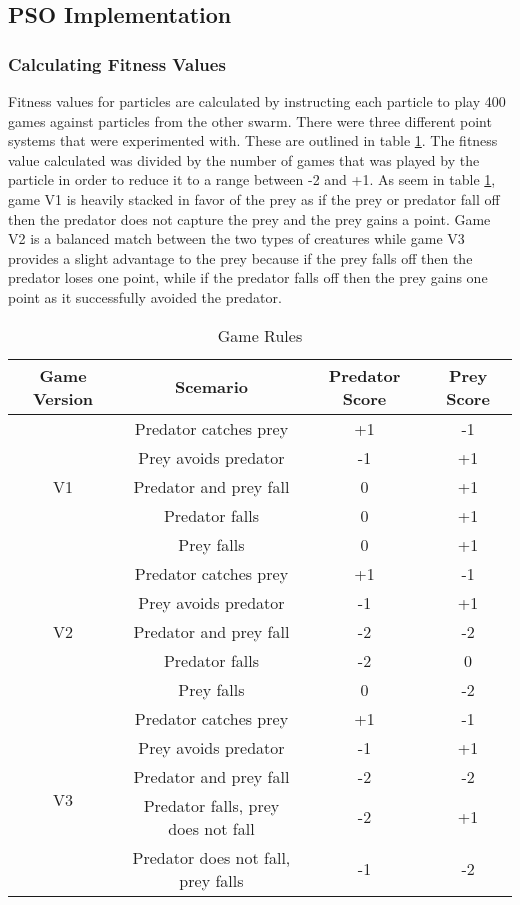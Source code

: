\subsection{PSO Implementation}

\subsubsection{Calculating Fitness Values}
Fitness values for particles are calculated by instructing each particle to play 400 games against particles from the other swarm. There were three different point systems that were experimented with. These are outlined in table \ref{tab:game-rules}. The fitness value calculated was divided by the number of games that was played by the particle in order to reduce it to a range between -2 and +1. As seem in table \ref{tab:game-rules}, game V1 is heavily stacked in favor of the prey as if the prey or predator fall off then the predator does not capture the prey and the prey gains a point. Game V2 is a balanced match between the two types of creatures while game V3 provides a slight advantage to the prey because if the prey falls off then the predator loses one point, while if the predator falls off then the prey gains one point as it successfully avoided the predator.

\begin{table}
  \centering
  \begin{tabular}{|c|c|c|c|}
    \hline
    Game Version & Scemario & Predator Score & Prey Score\\
    \hline
    \multirow{ 5}{*}{V1} & Predator catches prey & +1 & -1 \\
    & Prey avoids predator & -1 & +1\\ 
    & Predator and prey fall & 0 & +1 \\
    & Predator falls & 0 & +1 \\
    & Prey falls & 0 & +1 \\
    \hline
    \multirow{ 5}{*}{V2} & Predator catches prey& +1 & -1\\
    & Prey avoids predator & -1 & +1\\ 
    & Predator and prey fall & -2 & -2 \\
    & Predator falls & -2 & 0 \\
    & Prey falls & 0 & -2 \\
    \hline
    \multirow{ 5}{*}{V3} &  Predator catches prey & +1 & -1\\
    & Prey avoids predator & -1 & +1\\
    & Predator and prey fall & -2 & -2\\
    & Predator falls, prey does not fall & -2 & +1 \\
    & Predator does not fall, prey falls & -1 & -2 \\
    \hline
  \end{tabular}
  \caption{Game Rules}
  \label{tab:game-rules}
\end{table}

